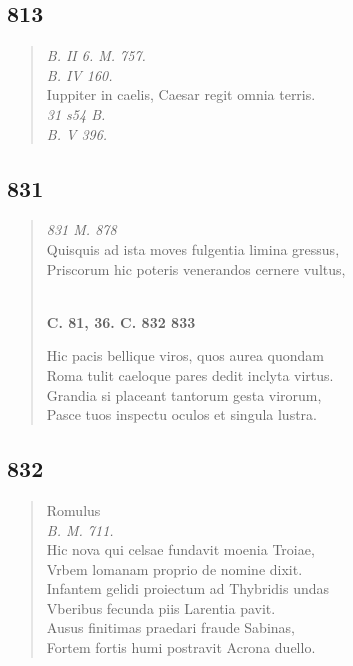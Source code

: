 \documentclass[11pt, a4paper]{report}
\begin{document}
            \subsection*{813}
      \begin{verse}
      \textit{B. II 6. M. 757.} \\ \textit{B. IV 160.} \\ Iuppiter in caelis, Caesar regit omnia terris. \\ \textit{31 s54 B.} \\ \textit{B. V 396.} \\ 
      \end{verse}
  
            \subsection*{831}
      \begin{verse}
      \textit{831 M. 878} \\ Quisquis ad ista moves fulgentia limina gressus, \\ Priscorum hic poteris venerandos cernere vultus, \\ 
        ﻿\pagebreak 
    \begin{center} \textbf{C. 81, 36. C. 832 833} \end{center} \marginpar{[301]} Hic pacis bellique viros, quos aurea quondam \\ Roma tulit caeloque pares dedit inclyta virtus. \\ Grandia si placeant tantorum gesta virorum, \\ Pasce tuos inspectu oculos et singula lustra. \\ 
      \end{verse}
  
            \subsection*{832}
      \begin{verse}
      Romulus \\ \textit{B. M. 711.} \\ Hic nova qui celsae fundavit moenia Troiae, \\ Vrbem lomanam proprio de nomine dixit. \\ Infantem gelidi proiectum ad Thybridis undas \\ Vberibus fecunda piis Larentia pavit. \\ Ausus finitimas praedari fraude Sabinas, \\ Fortem fortis humi postravit Acrona duello. \\ 
      \end{verse}
  
\end{document}
